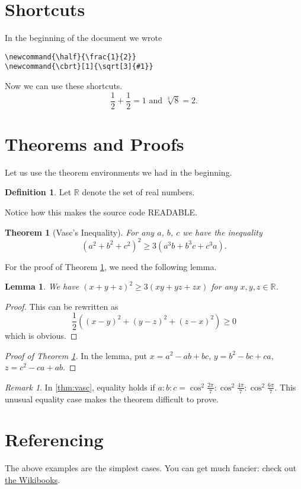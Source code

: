 \documentclass[11pt]{article}
\theoremstyle{plain} %
\newtheorem*{theorem}{Theorem}
\newtheorem*{lemma}{Lemma}
\theoremstyle{definition}
\newtheorem*{definition}{Definition} %
\theoremstyle{example}
\theoremstyle{remark}
\newtheorem*{remark}{Remark}
\newcommand{\half}{\frac{1}{2}}
\newcommand{\cbrt}[1]{\sqrt[3]{#1}}
\begin{document}
\section{Shortcuts}
In the beginning of the document we wrote
\begin{verbatim}
\newcommand{\half}{\frac{1}{2}}
\newcommand{\cbrt}[1]{\sqrt[3]{#1}}
\end{verbatim}
Now we can use these shortcuts.
\[ \half + \half = 1 \text{ and } \cbrt{8} = 2. \]

\section{Theorems and Proofs}
\label{sec:theorem}
Let us use the theorem environments we had in the beginning.
\begin{definition}
	Let $\mathbb R$ denote the set of real numbers.
\end{definition}
Notice how this makes the source code READABLE.

\begin{theorem}
	[Vasc's Inequality]
	\label{thm:vasc}
	For any $a$, $b$, $c$ we have the inequality
	\[ \left( a^2+b^2+c^2 \right)^2 \ge 3\left( a^3b+b^3c+c^3a \right). \]
\end{theorem}

For the proof of Theorem \ref{thm:vasc}, we need the following lemma.

\begin{lemma}
	We have $\left( x+y+z \right)^2 \ge 3(xy+yz+zx)$ for any $x,y,z \in \mathbb R$.
\end{lemma}
\begin{proof}
	This can be rewritten as
	\[ \half\left( (x-y)^2+(y-z)^2+(z-x)^2 \right) \ge 0 \]
	which is obvious.
\end{proof}

\begin{proof}
	[Proof of Theorem \ref{thm:vasc}]
	In the lemma, put $x=a^2-ab+bc$, $y=b^2-bc+ca$, $z=c^2-ca+ab$.
\end{proof}

\begin{remark}
	In \autoref{thm:vasc}, equality holds if $a : b : c = \cos^2 \frac{2\pi}{7} : \cos^2 \frac{4\pi}{7} : \cos^2 \frac{6\pi}{7}$.
	This unusual equality case makes the theorem difficult to prove.
\end{remark}


\section{Referencing}
The above examples are the simplest cases.
You can get much fancier: check out
\href{http://en.wikibooks.org/wiki/LaTeX/Labels_and_Cross-referencing}{the Wikibooks}.
\end{document}
